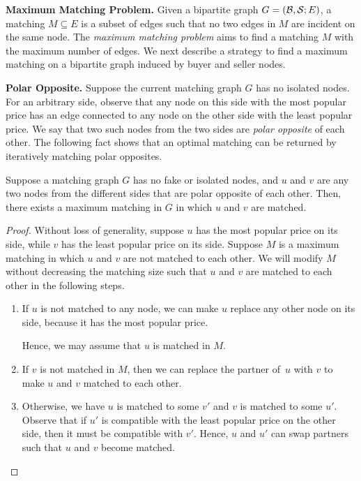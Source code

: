 \noindent \textbf{Maximum Matching Problem.}
Given a bipartite graph $G = (\mathcal {B}, \mathcal {S}; E)$,
a matching $M \subseteq E$ is a subset of edges
such that no two edges in $M$ are incident on the same node.
The \emph{maximum matching problem} aims to find a matching
$M$ with the maximum number of edges.  We next describe a
strategy to find a maximum matching on a bipartite graph
induced by buyer and seller nodes.



\noindent \textbf{Polar Opposite.}
Suppose the current matching graph $G$ has no isolated nodes.
For an arbitrary side, %
observe that any node on this side
with the most popular price has an edge connected to
any node on the other side %
with the least popular price.
We say that two such nodes from the two sides are \emph{polar opposite} of each other.
The following fact shows that an optimal matching can be returned by iteratively matching
polar opposites.

\begin{fact}
\label{fact:basic_matching}
Suppose a matching graph $G$ has no fake or isolated nodes,
and $u$ and $v$ are any two nodes from the different sides that
are polar opposite of each other.
Then, there exists a maximum matching in $G$ in which $u$ and $v$ are matched.
\end{fact}

\begin{proof}
Without loss of generality, suppose $u$ has the most popular price
on its side, while $v$ has the least popular price on its side.
Suppose $M$ is a maximum matching in which $u$ and $v$ are not matched
to each other.  We will modify $M$ without decreasing the matching size such that $u$ and $v$
are matched to each other in the following steps.

\begin{enumerate}

\item If $u$ is not matched to any node, we can make $u$ replace
any other node on its side, because it has the most popular price.

Hence, we may assume that $u$ is matched in $M$.

\item If $v$ is not matched in $M$, then we can replace the partner of~$u$
with $v$ to make $u$ and $v$ matched to each other.

\item Otherwise, we have $u$ is matched to some $v'$ and $v$ is matched to some $u'$.
Observe that if $u'$ is compatible with the least popular price on the other side,
then it must be compatible with $v'$.  Hence, $u$ and $u'$ can swap partners
such that $u$ and $v$ become matched.
\end{enumerate}
\end{proof}



